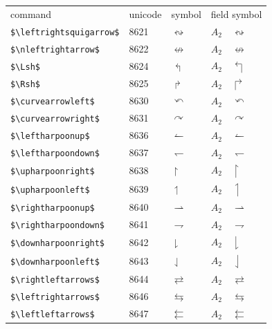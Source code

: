 ﻿\documentclass{article}
\begin{document}
\clearpage
\begin{table}
\begin{center}
\begin{tabular}{llll}
 command                       & unicode & symbol                 & field symbol\\
 \verb#$\leftrightsquigarrow$# & 8621    & $\leftrightsquigarrow$ & $A_2\quad \leftrightsquigarrow$\\
 \verb#$\nleftrightarrow$#     & 8622    & $\nleftrightarrow$     & $A_2\quad \nleftrightarrow$\\
 \verb#$\Lsh$#                 & 8624    & $\Lsh$                 & $A_2\quad \Lsh$\\
 \verb#$\Rsh$#                 & 8625    & $\Rsh$                 & $A_2\quad \Rsh$\\
 \verb#$\curvearrowleft$#      & 8630    & $\curvearrowleft$      & $A_2\quad \curvearrowleft$\\
 \verb#$\curvearrowright$#     & 8631    & $\curvearrowright$     & $A_2\quad \curvearrowright$\\
 \verb#$\leftharpoonup$#       & 8636    & $\leftharpoonup$       & $A_2\quad \leftharpoonup$\\
 \verb#$\leftharpoondown$#     & 8637    & $\leftharpoondown$     & $A_2\quad \leftharpoondown$\\
 \verb#$\upharpoonright$#      & 8638    & $\upharpoonright$      & $A_2\quad \upharpoonright$\\
 \verb#$\upharpoonleft$#       & 8639    & $\upharpoonleft$       & $A_2\quad \upharpoonleft$\\
 \verb#$\rightharpoonup$#      & 8640    & $\rightharpoonup$      & $A_2\quad \rightharpoonup$\\
 \verb#$\rightharpoondown$#    & 8641    & $\rightharpoondown$    & $A_2\quad \rightharpoondown$\\
 \verb#$\downharpoonright$#    & 8642    & $\downharpoonright$    & $A_2\quad \downharpoonright$\\
 \verb#$\downharpoonleft$#     & 8643    & $\downharpoonleft$     & $A_2\quad \downharpoonleft$\\
 \verb#$\rightleftarrows$#     & 8644    & $\rightleftarrows$     & $A_2\quad \rightleftarrows$\\
 \verb#$\leftrightarrows$#     & 8646    & $\leftrightarrows$     & $A_2\quad \leftrightarrows$\\
 \verb#$\leftleftarrows$#      & 8647    & $\leftleftarrows$      & $A_2\quad \leftleftarrows$\\

\end{tabular}
\end{center}
\end{table}
\end{document}
